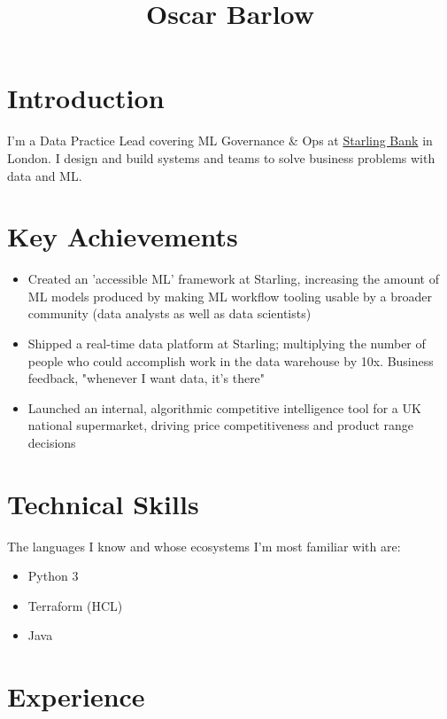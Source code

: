 \documentclass[a4paper,10pt]{article}
\title{Oscar Barlow}
\date{}
\begin{document}
\maketitle

\section*{Introduction}
I'm a Data Practice Lead covering ML Governance \& Ops at
\href{https://www.starlingbank.com/}{Starling Bank} in London. I design and
build systems and teams to solve business problems with data and ML.

\section*{Key Achievements}
\begin{itemize}
    \item Created an 'accessible ML' framework at Starling, increasing the
          amount of ML models produced by making ML workflow tooling usable by a broader
          community (data analysts as well as data scientists)
    \item Shipped a real-time data platform at Starling; multiplying the number
          of people who could accomplish work in the data warehouse by 10x. Business
          feedback, "whenever I want data, it's there"
    \item Launched an internal, algorithmic competitive intelligence tool for a
          UK national supermarket, driving price competitiveness and product range
          decisions
\end{itemize}

\section*{Technical Skills}
The languages I know and whose ecosystems I'm most familiar with are:
\begin{itemize}
    \item Python 3
    \item Terraform (HCL)
    \item Java
\end{itemize}

\section*{Experience}
\end{document}
